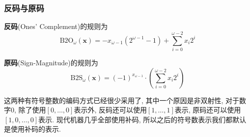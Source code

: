 \documentclass[utf8]{ctexart} %
\begin{document}
\subsubsection{反码与原码}
\textbf{反码}(Ones' Complement)的规则为$$\mathrm{B2O}_{\omega}(\boldsymbol{x})=-x_{\omega-1}(2^{\omega-1}-1)+\sum_{i=0}^{\omega-2}x_i2^i$$
\par
\textbf{原码}(Sign-Magnitude)的规则为$$\mathrm{B2S}_{\omega}(\boldsymbol{x})=(-1)^{x_{\omega-1}}\cdot(\sum_{i=0}^{\omega-2}x_i2^i)$$
\par 
这两种有符号整数的编码方式已经很少采用了, 其中一个原因是非双射性, 对于数字0, 除了使用$[0,\dots,0]$表示外, 反码还可以使用$[1,\dots,1]$表示, 原码还可以使用$[1,0,\dots,0]$表示. 现代机器几乎全部使用补码, 所以之后的符号数表示我们都默认是使用补码的表示.
\end{document}
